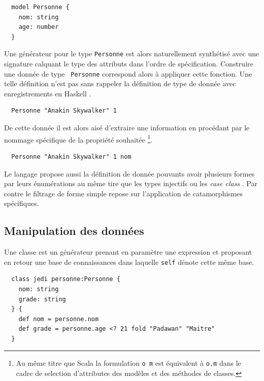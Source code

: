 \documentclass[twoside,a4paper]{article}
\begin{document}
\lstset{language=Thicket}
\begin{lstlisting}
  model Personne {  
    nom: string   
    age: number
  }
\end{lstlisting}

Une générateur  pour le  type {\tt  Personne} est  alors naturellement
synthétisé  avec une  signature calquant  le type  des attributs  dans
l'ordre  de  spécification.   Construire   une  donnée  de  type  {\tt
  Personne} correspond  alors à  appliquer cette fonction.   Une telle
définition n'est  pas sans  rappeler la définition  de type  de donnée
avec enregistrements en Haskell \cite{haskell}.

\lstset{language=Thicket}
\begin{lstlisting}
  Personne "Anakin Skywalker" 1 
\end{lstlisting}

De  cette donnée  il  est  alors aisé  d'extraire  une information  en
procédant par le nommage spécifique de la propriété souhaitée 
\footnote{Au  même  titre que  Scala  la  formulation  {\tt o  m}  est
  équivalent à {\tt o.m} dans le cadre de selection d'attributes des
  modèles et des méthodes de classes.}.

\lstset{language=Thicket}
\begin{lstlisting}
  Personne "Anakin Skywalker" 1 nom
\end{lstlisting}

Le  langage  propose aussi  la  définition  de donnée  pouvants  avoir
plusieurs formes  par leurs  énumérations au même  tire que  les types
injectifs  \cite{ocaml}   \cite{haskell}  ou  les  {\it   case  class}
\cite{scala}.   Par contre  le  filtrage de  forme  simple repose  sur
l'application     de    catamorphismes     \cite{meijer1991functional}
spécifiques.

\subsection{Manipulation des données}

Une classe  est un générateur  prenant en paramètre une  expression et
proposant en retour une base de connaissances dans laquelle {\tt self}
dénote cette même base. 

\lstset{language=Thicket}
\begin{lstlisting}
  class jedi personne:Personne {
    nom: string
    grade: string
  } {
    def nom = personne.nom
    def grade = personne.age <? 21 fold "Padawan" "Maitre"
  }
\end{lstlisting}
\end{document}
